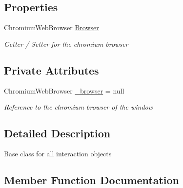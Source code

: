 \subsection*{Properties}
\begin{DoxyCompactItemize}
\item 
Chromium\+Web\+Browser \hyperlink{class_web_analyzer_1_1_u_i_1_1_interaction_objects_1_1_base_interaction_object_aac4f2f8441547dc677f700485c295259}{Browser}
\begin{DoxyCompactList}\small\item\em Getter / Setter for the chromium browser \end{DoxyCompactList}\end{DoxyCompactItemize}
\subsection*{Private Attributes}
\begin{DoxyCompactItemize}
\item 
Chromium\+Web\+Browser \hyperlink{class_web_analyzer_1_1_u_i_1_1_interaction_objects_1_1_base_interaction_object_aa56933a7ca14c6251019e27c6ec97813}{\+\_\+browser} = null
\begin{DoxyCompactList}\small\item\em Reference to the chromium browser of the window \end{DoxyCompactList}\end{DoxyCompactItemize}


\subsection{Detailed Description}
Base class for all interaction objects 



\subsection{Member Function Documentation}
\hypertarget{class_web_analyzer_1_1_u_i_1_1_interaction_objects_1_1_base_interaction_object_ab7fc25e42888acfba791389cbba16069}{}
